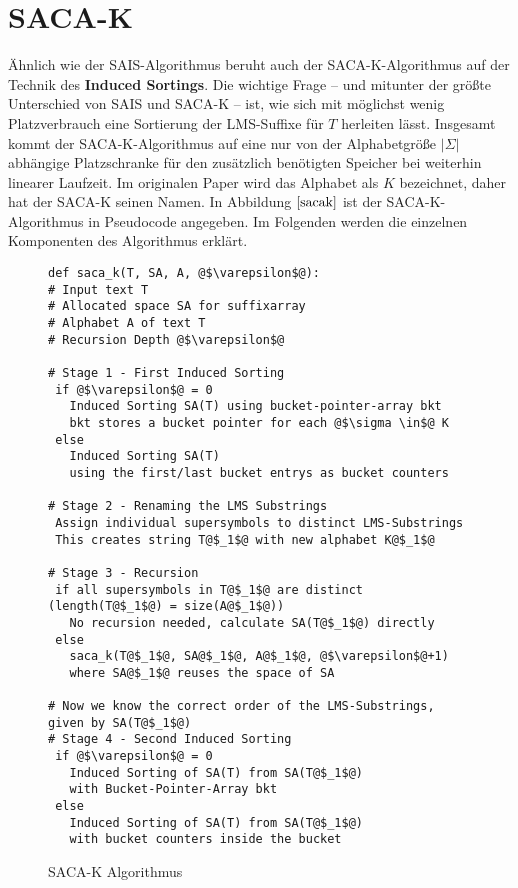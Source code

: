 \section{SACA-K}
\label{section:saca_k}

\newcommand {\suf} {\text{suf}}
\newcommand {\level} {\varepsilon}
\newcommand {\symbWidth} {0.3cm}

Ähnlich wie der SAIS-Algorithmus beruht auch der SACA-K-Algorithmus auf der Technik des \textbf{Induced Sortings}. Die wichtige Frage -- und mitunter der größte Unterschied von SAIS und SACA-K -- ist, wie sich mit möglichst wenig Platzverbrauch eine Sortierung der LMS-Suffixe für $T$ herleiten lässt. Insgesamt kommt der SACA-K-Algorithmus auf eine nur von der Alphabetgröße $|\Sigma|$ abhängige Platzschranke für den zusätzlich benötigten Speicher bei weiterhin linearer Laufzeit. Im originalen Paper wird das Alphabet als $K$ bezeichnet, daher hat der SACA-K seinen Namen. In Abbildung $\ref{sacak}$ ist der SACA-K-Algorithmus in Pseudocode angegeben. Im Folgenden werden die einzelnen Komponenten des Algorithmus erklärt.  \\

\begin{figure}
\begin{verbatim}
def saca_k(T, SA, A, @$\varepsilon$@):
# Input text T
# Allocated space SA for suffixarray
# Alphabet A of text T
# Recursion Depth @$\varepsilon$@

# Stage 1 - First Induced Sorting
 if @$\varepsilon$@ = 0
   Induced Sorting SA(T) using bucket-pointer-array bkt 
   bkt stores a bucket pointer for each @$\sigma \in$@ K
 else
   Induced Sorting SA(T) 
   using the first/last bucket entrys as bucket counters
		
# Stage 2 - Renaming the LMS Substrings
 Assign individual supersymbols to distinct LMS-Substrings
 This creates string T@$_1$@ with new alphabet K@$_1$@
	
# Stage 3 - Recursion
 if all supersymbols in T@$_1$@ are distinct (length(T@$_1$@) = size(A@$_1$@))
   No recursion needed, calculate SA(T@$_1$@) directly
 else
   saca_k(T@$_1$@, SA@$_1$@, A@$_1$@, @$\varepsilon$@+1)
   where SA@$_1$@ reuses the space of SA

# Now we know the correct order of the LMS-Substrings, given by SA(T@$_1$@)
# Stage 4 - Second Induced Sorting
 if @$\varepsilon$@ = 0
   Induced Sorting of SA(T) from SA(T@$_1$@) 
   with Bucket-Pointer-Array bkt
 else
   Induced Sorting of SA(T) from SA(T@$_1$@) 
   with bucket counters inside the bucket

\end{verbatim}
\caption{SACA-K Algorithmus} \cite{saca:7}
\label{sacak}
\end{figure}

